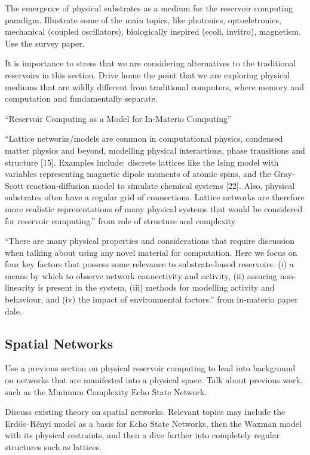 The emergence of physical substrates as a medium for the reservoir computing
paradigm. Illustrate some of the main topics, like photonics, optoeletronics,
mechanical (coupled oscillators), biologically inspired (ecoli, invitro),
magnetism. Use the survey paper.

It is importance to stress that we are considering alternatives to the
traditional reservoirs in this section. Drive home the point that we are
exploring physical mediums that are wildly different from traditional computers,
where memory and computation and fundamentally separate.

``Reservoir Computing as a Model for In-Materio Computing''

``Lattice networks/models are common in computational physics, condensed matter
physics and beyond, modelling physical interactions, phase transitions and
structure [15]. Examples include: discrete lattices like the Ising model with
variables representing magnetic dipole moments of atomic spins, and the Gray-
Scott reaction-diffusion model to simulate chemical systems [22]. Also, physical
substrates often have a regular grid of connections. Lattice networks are
therefore more realistic representations of many physical systems that would be
considered for reservoir computing.'' from role of structure and complexity

``There are many physical properties and considerations that require discussion
when talking about using any novel material for computation. Here we focus on four
key factors that possess some relevance to substrate-based reservoirs: (i) a means
by which to observe network connectivity and activity, (ii) assuring non-linearity is
present in the system, (iii) methods for modelling activity and behaviour, and (iv)
the impact of environmental factors.'' from in-materio paper dale.

\subsection{Spatial Networks}

Use a previous section on physical reservoir computing to lead into background
on networks that are manifested into a physical space. Talk about previous work,
such as the Minimum Complexity Echo State Network.

Discuss existing theory on spatial networks. Relevant topics may include the
Erdős–Rényi model as a basis for Echo State Networks, then the Waxman model with
its physical restraints, and then a dive further into completely regular
structures such as lattices.

